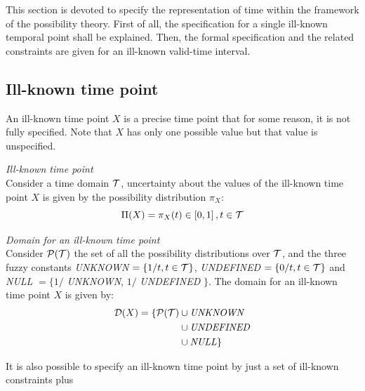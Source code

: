 %
%

This section is devoted to specify the representation of time within the framework of the possibility theory. First of all, the specification for a single ill-known temporal point shall be explained. Then, the formal specification and the related constraints are given for an ill-known valid-time interval.

\subsection{\label{subsec:ill-known-point-rep}Ill-known time point}
An ill-known time point $X$ is a precise time point that for some reason, it is not fully specified. Note that $X$ has only one possible value but that value is unspecified.

\begin{definition}
\label{def:ill-known-time-point}
\emph{Ill-known time point}\\
Consider a time domain $\mathcal{T}$, uncertainty about the values of the ill-known time point $X$ is given by the possibility distribution $\pi_X$:
\begin{equation}
\label{eq:ill-known-time-point}
\Pi(X) = \pi_X(t) \in \left[0,1\right] , t \in \mathcal{T}
\end{equation}
\end{definition}

\begin{definition}
\label{def:ill-known-domain}
\emph{Domain for an ill-known time point}\\
Consider $\mathcal{P}(\mathcal{T})$ the set of all the possibility distributions over $\mathcal{T}$, and the three fuzzy constants \emph{UNKNOWN} $=\left\lbrace 1/t, t \in \mathcal{T} \right\rbrace$, \emph{UNDEFINED} $=\left\lbrace 0/t, t \in \mathcal{T} \right\rbrace$ and \emph{NULL} $=\lbrace 1/$ \emph{UNKNOWN}, $1/$ \emph{UNDEFINED} $\rbrace$. The domain for an ill-known time point $X$ is given by: 
\begin{align}
\label{eq:ill-known-domain}
\Dom (X) =  \lbrace \Pow(\T) & \cup \mbox{\emph{UNKNOWN}} \\
\nonumber
&\cup \mbox{\emph{UNDEFINED}} \\
\nonumber
&\cup \mbox{\emph{NULL}} \rbrace
%
\end{align}
\end{definition}

It is also possible to specify an ill-known time point by just a set of ill-known constraints plus 



